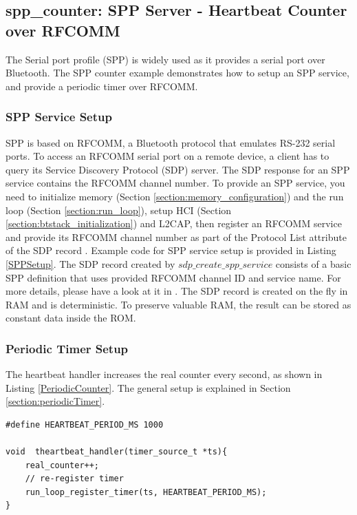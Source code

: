 \documentclass[a4paper,titlepage,oneside,12pt]{amsart} %
\begin{document}
\subsection {spp\_counter: SPP Server - Heartbeat Counter over RFCOMM}
\label{section:sppcounter}
    The Serial port profile (SPP) is widely used as it provides a serial port over Bluetooth. The SPP counter example demonstrates how to setup an SPP service, and provide a periodic timer over RFCOMM. 
    
 \subsubsection{SPP Service Setup}
    
    SPP is based on RFCOMM, a Bluetooth protocol that emulates RS-232 serial ports. To access an RFCOMM serial port on a remote device, a client has to query its Service Discovery Protocol (SDP) server. The SDP response for an SPP service contains the RFCOMM channel number. To provide an SPP service, you need to initialize memory (Section \ref{section:memory_configuration}) and the run loop (Section \ref{section:run_loop}), setup HCI (Section \ref{section:btstack_initialization}) and L2CAP, then register an RFCOMM service and provide its RFCOMM channel number as part of the Protocol List attribute of the SDP record . Example code for SPP service setup is provided in Listing \ref{SPPSetup}. The SDP record created by $sdp\_create\_spp\_service$ consists of a basic SPP definition that uses provided RFCOMM channel ID and service name. For more details, please have a look at it in . The SDP record is created on the fly in RAM and is deterministic. To preserve valuable RAM, the result can be stored as constant data inside the ROM.

    
\subsubsection{Periodic Timer Setup}

The heartbeat handler increases the real counter every second, as shown in Listing \ref{PeriodicCounter}. The general setup is explained in Section \ref{section:periodicTimer}.

\begin{lstlisting}[caption=Periodic counter, label=PeriodicCounter]
#define HEARTBEAT_PERIOD_MS 1000

void  theartbeat_handler(timer_source_t *ts){
    real_counter++;
    // re-register timer
    run_loop_register_timer(ts, HEARTBEAT_PERIOD_MS);
} 

\end{lstlisting}
\end{document}
